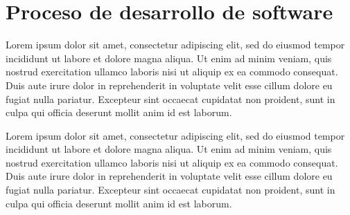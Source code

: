 \chapter{Proceso de desarrollo de software}\label{ch:appendix_2}

Lorem ipsum dolor sit amet, consectetur adipiscing elit, sed do eiusmod tempor incididunt ut labore et dolore magna
aliqua. Ut enim ad minim veniam, quis nostrud exercitation ullamco laboris nisi ut aliquip ex ea commodo consequat. Duis
aute irure dolor in reprehenderit in voluptate velit esse cillum dolore eu fugiat nulla pariatur. Excepteur sint
occaecat cupidatat non proident, sunt in culpa qui officia deserunt mollit anim id est laborum.

Lorem ipsum dolor sit amet, consectetur adipiscing elit, sed do eiusmod tempor incididunt ut labore et dolore magna
aliqua. Ut enim ad minim veniam, quis nostrud exercitation ullamco laboris nisi ut aliquip ex ea commodo consequat. Duis
aute irure dolor in reprehenderit in voluptate velit esse cillum dolore eu fugiat nulla pariatur. Excepteur sint
occaecat cupidatat non proident, sunt in culpa qui officia deserunt mollit anim id est laborum.
